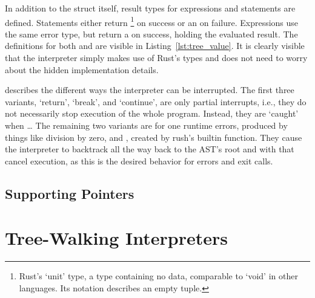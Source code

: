 
        In addition to the struct itself, result types for expressions and statements are defined.
        Statements either return \qVerb{()}\footnote{Rust's `unit' type, a type containing no data, comparable to `void' in other languages. Its notation describes an empty tuple.} on success or an  on failure.
        Expressions use the same error type, but return a  on success, holding the evaluated result.
        The definitions for both  and  are visible in Listing~\ref{lst:tree_value}.
        It is clearly visible that the interpreter simply makes use of Rust's types and does not need to worry about the hidden implementation details.


         describes the different ways the interpreter can be interrupted.
        The first three variants, `return', `break', and `continue', are only partial interrupts, i.e., they do not necessarily stop execution of the whole program.
        Instead, they are `caught' when \ldots
        The remaining two variants are for one runtime errors, produced by things like division by zero, and , created by rush's builtin  function.
        They cause the interpreter to backtrack all the way back to the AST's root and with that cancel execution, as this is the desired behavior for errors and exit calls.

        \subsection{Supporting Pointers}\label{sec:tree_pointers}

        \section{Tree-Walking Interpreters}


